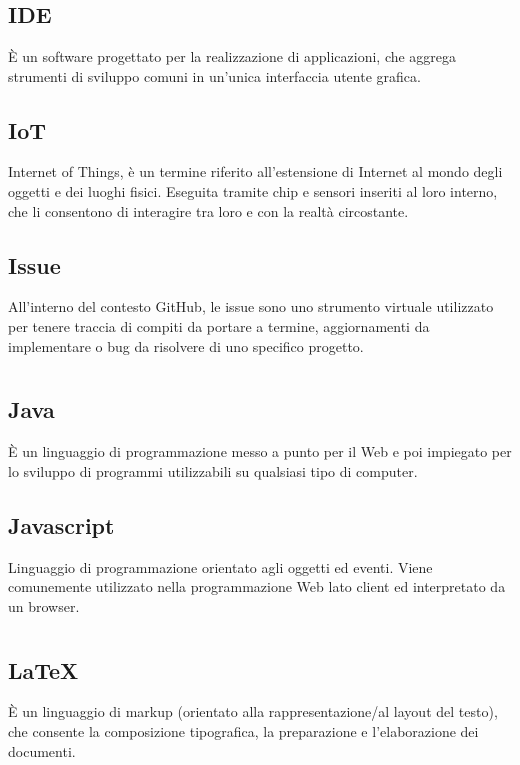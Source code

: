 \section[I]{}
	\subsection*{IDE}
	È un software progettato per la realizzazione di applicazioni, che aggrega strumenti di sviluppo comuni in un’unica interfaccia utente grafica.
	\subsection*{IoT}
	Internet of Things, è un termine riferito all’estensione di Internet al mondo degli oggetti e dei luoghi fisici. Eseguita tramite chip e sensori inseriti al loro interno, che li consentono di interagire tra loro e con la realtà circostante.
	\subsection*{Issue}
	All'interno del contesto GitHub, le issue sono uno strumento virtuale utilizzato per tenere traccia di compiti da portare a termine, aggiornamenti da implementare o bug da risolvere di uno specifico progetto.
\pagebreak
\section[J]{}
	\subsection*{Java}
	È un linguaggio di programmazione messo a punto per il Web e poi impiegato per lo sviluppo di programmi utilizzabili su qualsiasi tipo di computer.
	\subsection*{Javascript}
	Linguaggio di programmazione orientato agli oggetti ed eventi. Viene comunemente utilizzato nella programmazione Web lato client ed interpretato da un browser.
\pagebreak
\section[L]{}
	\subsection*{\LaTeX{}}
	È un linguaggio di markup (orientato alla rappresentazione/al layout del testo), che consente la composizione tipografica, la preparazione e l'elaborazione dei documenti.
